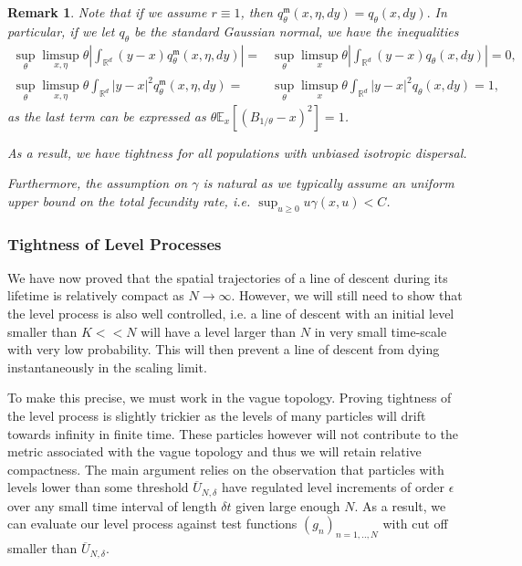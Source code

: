 \documentclass[12pt]{article}
\newtheorem{remark}[theorem]{Remark}
\begin{document}
\begin{remark}
Note that if we assume $r \equiv 1$, then 
$q^{\mathfrak{m}}_{\theta}(x,\eta,dy)=q_{\theta}(x,dy).$
In particular, if we let $q_{\theta}$ be the standard Gaussian normal, we have the inequalities
\begin{align}
   \sup_{\theta}\limsup_{x, \eta} \theta \left| \int_{\mathbb{R}^d} (y-x) q^{\mathfrak{m}}_{ \theta}(x,\eta,dy) \right| =& \sup_{\theta}\limsup_{x} \theta \left| \int_{\mathbb{R}^d} (y-x) q_{\theta}(x,dy) \right| =  0,\\
   \sup_{\theta}\limsup_{x, \eta} \theta \int_{\mathbb{R}^d} |y-x|^2 q^{\mathfrak{m}}_{ \theta}(x,\eta,dy)  =& \sup_{\theta}\limsup_{x} \theta \int_{\mathbb{R}^d} |y-x|^2 q_{\theta}(x,dy) =  1,
\end{align}
as the last term can be expressed as $\theta \mathbb{E}_{x}[(B_{1/\theta}-x)^2]=1$.

As a result, we have tightness for all populations with unbiased isotropic dispersal.

Furthermore, the assumption on $\gamma$ is natural as we typically assume an uniform upper bound on the total fecundity rate, i.e.
$\sup_{u \geq 0} u\gamma(x,u) < C$.
\end{remark}


\subsubsection{Tightness of Level Processes}
We have now proved that the spatial trajectories of a line of descent during its lifetime is relatively compact as $N \to \infty$. However, we will still need to show that the level process is also well controlled, i.e. a line of descent with an initial level smaller than $K << N$ will have a level larger than $N$ in very small time-scale with very low probability. This will then prevent a line of descent from dying instantaneously in the scaling limit.

To make this precise, we must work in the vague topology. Proving tightness of the level process is slightly trickier as the levels of many particles will drift towards infinity in finite time. These particles however will not contribute to the metric associated with the vague topology and thus we will retain relative compactness. The main argument relies on the observation that particles with levels lower than some threshold $\overline{U}_{N, \delta}$  have regulated level increments of order $\epsilon$ over any small time interval of length $\delta t$ given large enough $N$. As a result, we can evaluate our level process against test functions $(g_n)_{n=1,..,N}$ with cut off smaller than $\overline{U}_{N, \delta}$. 
\end{document}
